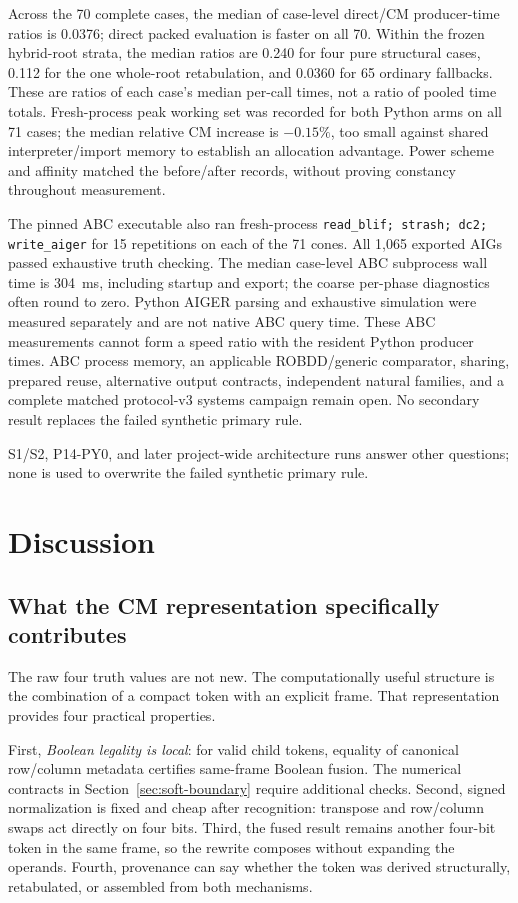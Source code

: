 \documentclass[10pt]{article}
\theoremstyle{plain}
\theoremstyle{definition}
\theoremstyle{remark}
\begin{document}
Across the 70 complete cases, the median of case-level direct/CM producer-time ratios is 0.0376; direct packed evaluation is faster on all 70. Within the frozen hybrid-root strata, the median ratios are 0.240 for four pure structural cases, 0.112 for the one whole-root retabulation, and 0.0360 for 65 ordinary fallbacks. These are ratios of each case's median per-call times, not a ratio of pooled time totals. Fresh-process peak working set was recorded for both Python arms on all 71 cases; the median relative CM increase is $-0.15\%$, too small against shared interpreter/import memory to establish an allocation advantage. Power scheme and affinity matched the before/after records, without proving constancy throughout measurement.

The pinned ABC executable also ran fresh-process \texttt{read\_blif; strash; dc2; write\_aiger} for 15 repetitions on each of the 71 cones. All 1,065 exported AIGs passed exhaustive truth checking. The median case-level ABC subprocess wall time is 304~ms, including startup and export; the coarse per-phase diagnostics often round to zero. Python AIGER parsing and exhaustive simulation were measured separately and are not native ABC query time. These ABC measurements cannot form a speed ratio with the resident Python producer times. ABC process memory, an applicable ROBDD/generic comparator, sharing, prepared reuse, alternative output contracts, independent natural families, and a complete matched protocol-v3 systems campaign remain open. No secondary result replaces the failed synthetic primary rule.

S1/S2, P14-PY0, and later project-wide architecture runs answer other questions; none is used to overwrite the failed synthetic primary rule.

\section{Discussion}
\label{sec:discussion}

\subsection{What the CM representation specifically contributes}

The raw four truth values are not new. The computationally useful structure is the combination of a compact token with an explicit frame. That representation provides four practical properties.

First, \emph{Boolean legality is local}: for valid child tokens, equality of canonical row/column metadata certifies same-frame Boolean fusion. The numerical contracts in Section~\ref{sec:soft-boundary} require additional checks. Second, signed normalization is fixed and cheap after recognition: transpose and row/column swaps act directly on four bits. Third, the fused result remains another four-bit token in the same frame, so the rewrite composes without expanding the operands. Fourth, provenance can say whether the token was derived structurally, retabulated, or assembled from both mechanisms.
\end{document}
